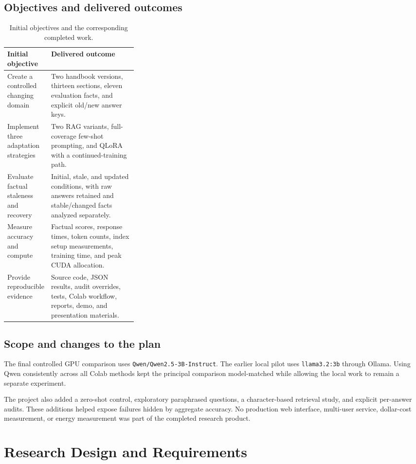 \documentclass[11pt,letterpaper,oneside]{report}
\begin{document}
\section{Objectives and delivered outcomes}
\begin{table}[H]\centering\small
\caption{Initial objectives and the corresponding completed work.}
\begin{tabularx}{\linewidth}{P{0.31\linewidth}L}\toprule
Initial objective & Delivered outcome\\\midrule
Create a controlled changing domain & Two handbook versions, thirteen sections, eleven evaluation facts, and explicit old/new answer keys.\\
Implement three adaptation strategies & Two RAG variants, full-coverage few-shot prompting, and QLoRA with a continued-training path.\\
Evaluate factual staleness and recovery & Initial, stale, and updated conditions, with raw answers retained and stable/changed facts analyzed separately.\\
Measure accuracy and compute & Factual scores, response times, token counts, index setup measurements, training time, and peak CUDA allocation.\\
Provide reproducible evidence & Source code, JSON results, audit overrides, tests, Colab workflow, reports, demo, and presentation materials.\\\bottomrule
\end{tabularx}
\end{table}

\section{Scope and changes to the plan}
The final controlled GPU comparison uses \texttt{Qwen/Qwen2.5-3B-Instruct}. The earlier local pilot uses \texttt{llama3.2:3b} through Ollama. Using Qwen consistently across all Colab methods kept the principal comparison model-matched while allowing the local work to remain a separate experiment.

The project also added a zero-shot control, exploratory paraphrased questions, a character-based retrieval study, and explicit per-answer audits. These additions helped expose failures hidden by aggregate accuracy. No production web interface, multi-user service, dollar-cost measurement, or energy measurement was part of the completed research product.

\chapter{Research Design and Requirements}
\end{document}
